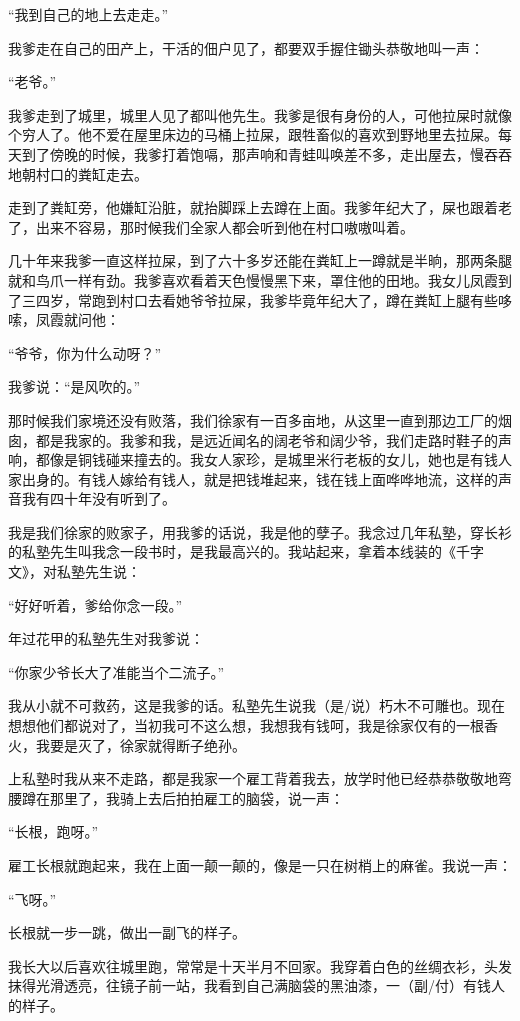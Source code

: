\documentclass[12pt,UTF8]{ctexbook}
\begin{document}
“我到自己的地上去走走。”

我爹走在自己的田产上，干活的佃户见了，都要双手握住锄头恭敬地叫一声：

“老爷。”

我爹走到了城里，城里人见了都叫他先生。我爹是很有身份的人，可他拉屎时就像个穷人了。他不爱在屋里床边的马桶上拉屎，跟牲畜似的喜欢到野地里去拉屎。每天到了傍晚的时候，我爹打着饱嗝，那声响和青蛙叫唤差不多，走出屋去，慢吞吞地朝村口的粪缸走去。

走到了粪缸旁，他嫌缸沿脏，就抬脚踩上去蹲在上面。我爹年纪大了，屎也跟着老了，出来不容易，那时候我们全家人都会听到他在村口嗷嗷叫着。

几十年来我爹一直这样拉屎，到了六十多岁还能在粪缸上一蹲就是半晌，那两条腿就和鸟爪一样有劲。我爹喜欢看着天色慢慢黑下来，罩住他的田地。我女儿凤霞到了三四岁，常跑到村口去看她爷爷拉屎，我爹毕竟年纪大了，蹲在粪缸上腿有些哆嗦，凤霞就问他：

“爷爷，你为什么动呀？”

我爹说：“是风吹的。”

那时候我们家境还没有败落，我们徐家有一百多亩地，从这里一直到那边工厂的烟囱，都是我家的。我爹和我，是远近闻名的阔老爷和阔少爷，我们走路时鞋子的声响，都像是铜钱碰来撞去的。我女人家珍，是城里米行老板的女儿，她也是有钱人家出身的。有钱人嫁给有钱人，就是把钱堆起来，钱在钱上面哗哗地流，这样的声音我有四十年没有听到了。

我是我们徐家的败家子，用我爹的话说，我是他的孽子。我念过几年私塾，穿长衫的私塾先生叫我念一段书时，是我最高兴的。我站起来，拿着本线装的《千字文》，对私塾先生说：

“好好听着，爹给你念一段。”

年过花甲的私塾先生对我爹说：

“你家少爷长大了准能当个二流子。”

我从小就不可救药，这是我爹的话。私塾先生说我（是/说）朽木不可雕也。现在想想他们都说对了，当初我可不这么想，我想我有钱呵，我是徐家仅有的一根香火，我要是灭了，徐家就得断子绝孙。

上私塾时我从来不走路，都是我家一个雇工背着我去，放学时他已经恭恭敬敬地弯腰蹲在那里了，我骑上去后拍拍雇工的脑袋，说一声：

“长根，跑呀。”

雇工长根就跑起来，我在上面一颠一颠的，像是一只在树梢上的麻雀。我说一声：

“飞呀。”

长根就一步一跳，做出一副飞的样子。

我长大以后喜欢往城里跑，常常是十天半月不回家。我穿着白色的丝绸衣衫，头发抹得光滑透亮，往镜子前一站，我看到自己满脑袋的黑油漆，一（副/付）有钱人的样子。
\end{document}
